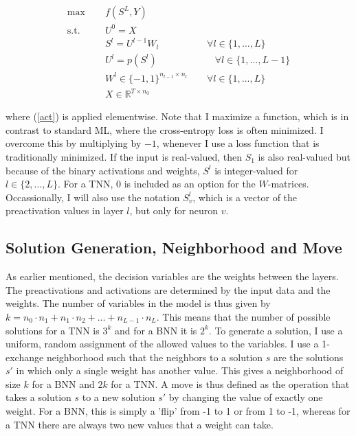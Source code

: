 \begin{align}
    \label{obj} \max \;\quad  & f(S^L, Y) \\
    \label{c1} \mbox{s.t.}\quad  & U^0 = X \\
    \label{c2} & S^l = U^{l-1}W_l \quad \quad \quad \quad \quad \forall l \in \{1, \ldots, L\} \\
    \label{c3} & U^l = p(S^l) \quad \quad \quad \quad \quad \quad \forall l \in \{1, \ldots, L- 1\} \\
    \label{c4} & W^l \in \{-1, 1\}^{n_{l-1} \times n_l} \quad \quad \forall l \in \{1, \ldots, L\} \\
    \label{c5} & X \in \mathbb{R}^{T \times n_0}
\end{align}

\noindent where (\ref{act}) is applied elementwise. Note that I maximize a function, which is in contrast to standard ML, where the cross-entropy loss is often minimized. I overcome this by multiplying by $-1$, whenever I use a loss function that is traditionally minimized. If the input is real-valued, then $S_1$ is also real-valued but because of the binary activations and weights, $S^l$ is integer-valued for $l\in \{2, \ldots, L\}$. For a TNN, 0 is included as an option for the $W$-matrices. Occassionally, I will also use the notation $S^l_v$, which is a vector of the preactivation values in layer $l$, but only for neuron $v$. 

\subsection{Solution Generation, Neighborhood and Move}

As earlier mentioned, the decision variables are the weights between the layers. The preactivations and activations are determined by the input data and the weights. The number of variables in the model is thus given by $k = n_0\cdot n_1 + n_1 \cdot n_2 + \ldots + n_{L-1} \cdot n_L$. This means that the number of possible solutions for a TNN is $3^k$ and for a BNN it is $2^k$. To generate a solution, I use a uniform, random assignment of the allowed values to the variables. I use a 1-exchange neighborhood such that the neighbors to a solution $s$ are the solutions $s'$ in which only a single weight has another value. This gives a neighborhood of size $k$ for a BNN and $2k$ for a TNN. A move is thus defined as the operation that takes a solution $s$ to a new solution $s'$ by changing the value of exactly one weight. For a BNN, this is simply a 'flip' from -1 to 1 or from 1 to -1, whereas for a TNN there are always two new values that a weight can take. \\

